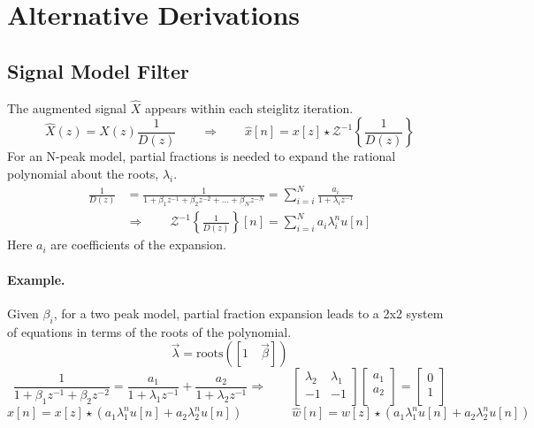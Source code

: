 \documentclass[10pt]{amsart}
\begin{document}
\section{Alternative Derivations } 
\subsection{Signal Model Filter } 
The augmented signal $\hat{X}$ appears within each steiglitz iteration.
\[
  \hat{X}(z) = X(z) \frac{1}{D(z)}
   \qquad \Rightarrow \qquad
  \hat{x}[n] = x[z]  \star \mathcal{Z}^{-1}\left\{\frac{1}{D(z)}\right\}
\]
For an N-peak model, partial fractions is needed to expand the rational polynomial about the roots, $\lambda_i$.
\[ \begin{split}
  \frac{1}{D(z)} & = 
  \frac{1}{1+\beta_1 z^{-1}+\beta_2 z^{-2}+...+\beta_N z^{-N}} = 
  \sum_{i=i}^N \frac{a_i}{1+\lambda_i z^{-1} }
  \\
   & \Rightarrow \qquad
   \mathcal{Z}^{-1}\left\{\frac{1}{D(z)}\right\}[n] = \sum_{i=i}^N a_i \lambda_i^n u[n] 
\end{split} \]
Here $a_i$ are coefficients of the expansion.
\paragraph{\textbf{Example.}}
Given $\beta_i$, for a two peak model, partial fraction expansion leads to a 2x2 system of equations
in terms of the roots of the polynomial.
\[
    \vec{\lambda} = \text{roots}( [1 \quad \vec{\beta}])
\]
\[
  \frac{1}{1+\beta_1 z^{-1}+\beta_2 z^{-2}}  
   = 
   \frac{a_1}{1+\lambda_1 z^{-1} }
   +
   \frac{a_2}{1+\lambda_2 z^{-1} }
    \Rightarrow \qquad
  \begin{bmatrix}
    \lambda_2 & \lambda_1 \\
       - 1    &    -1     \\ 
  \end{bmatrix}
  \begin{bmatrix}
    a_1 \\
    a_2 \\ 
  \end{bmatrix}
    = 
  \begin{bmatrix}
    0 \\
    1 \\ 
  \end{bmatrix}
\]
\[ 
  \hat{x}[n] = x[z]  \star \left( a_1 \lambda_1^n u[n]  + a_2 \lambda_2^n u[n] \right)
  \qquad
  \qquad
  \hat{w}[n] = w[z]  \star \left( a_1 \lambda_1^n u[n]  + a_2 \lambda_2^n u[n] \right)
\]
\end{document}
